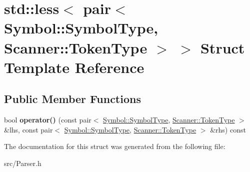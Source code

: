 \hypertarget{structstd_1_1less_3_01pair_3_01_symbol_1_1_symbol_type_00_01_scanner_1_1_token_type_01_4_01_4}{}\section{std\+:\+:less$<$ pair$<$ Symbol\+:\+:Symbol\+Type, Scanner\+:\+:Token\+Type $>$ $>$ Struct Template Reference}
\label{structstd_1_1less_3_01pair_3_01_symbol_1_1_symbol_type_00_01_scanner_1_1_token_type_01_4_01_4}
\subsection*{Public Member Functions}
\begin{DoxyCompactItemize}
\item 
\hypertarget{structstd_1_1less_3_01pair_3_01_symbol_1_1_symbol_type_00_01_scanner_1_1_token_type_01_4_01_4_a045e3f34a4fd30b0c1b362d6d255a3c4}{}\label{structstd_1_1less_3_01pair_3_01_symbol_1_1_symbol_type_00_01_scanner_1_1_token_type_01_4_01_4_a045e3f34a4fd30b0c1b362d6d255a3c4} 
bool {\bfseries operator()} (const pair$<$ \hyperlink{class_symbol_a7ee37d4cfcb980f4eddf7ed1a028da5a}{Symbol\+::\+Symbol\+Type}, \hyperlink{class_scanner_a1d588ca5cfd26bdff0e59b437da5b166}{Scanner\+::\+Token\+Type} $>$ \&lhs, const pair$<$ \hyperlink{class_symbol_a7ee37d4cfcb980f4eddf7ed1a028da5a}{Symbol\+::\+Symbol\+Type}, \hyperlink{class_scanner_a1d588ca5cfd26bdff0e59b437da5b166}{Scanner\+::\+Token\+Type} $>$ \&rhs) const
\end{DoxyCompactItemize}


The documentation for this struct was generated from the following file\+:\begin{DoxyCompactItemize}
\item 
src/Parser.\+h\end{DoxyCompactItemize}
